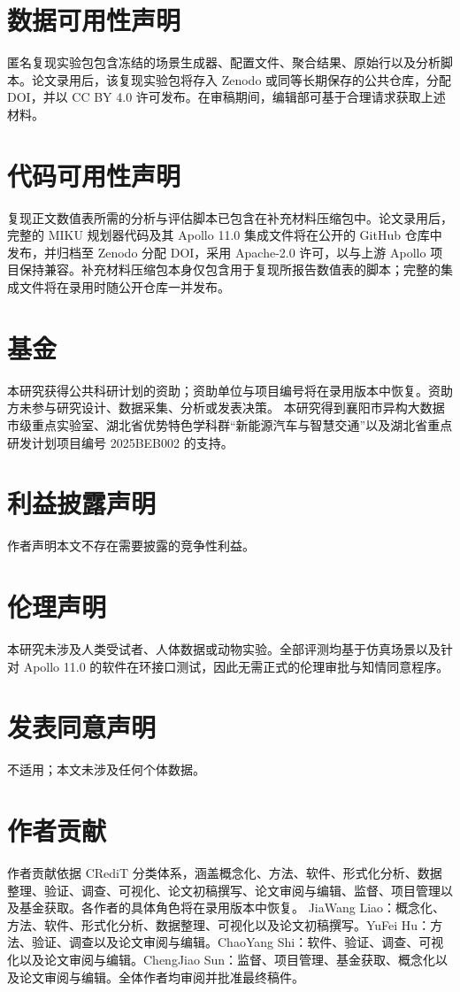 \section*{数据可用性声明}
匿名复现实验包包含冻结的场景生成器、配置文件、聚合结果、原始行以及分析脚本。论文录用后，该复现实验包将存入 Zenodo 或同等长期保存的公共仓库，分配 DOI，并以 CC BY 4.0 许可发布。在审稿期间，编辑部可基于合理请求获取上述材料。

\section*{代码可用性声明}
复现正文数值表所需的分析与评估脚本已包含在补充材料压缩包中。论文录用后，完整的 MIKU 规划器代码及其 Apollo 11.0 集成文件将在公开的 GitHub 仓库中发布，并归档至 Zenodo 分配 DOI，采用 Apache-2.0 许可，以与上游 Apollo 项目保持兼容。补充材料压缩包本身仅包含用于复现所报告数值表的脚本；完整的集成文件将在录用时随公开仓库一并发布。

\section*{基金}
\ifdefined\anonymousversion
本研究获得公共科研计划的资助；资助单位与项目编号将在录用版本中恢复。资助方未参与研究设计、数据采集、分析或发表决策。
\else
本研究得到襄阳市异构大数据市级重点实验室、湖北省优势特色学科群``新能源汽车与智慧交通''以及湖北省重点研发计划项目编号 2025BEB002 的支持。
\fi

\section*{利益披露声明}
作者声明本文不存在需要披露的竞争性利益。

\section*{伦理声明}
本研究未涉及人类受试者、人体数据或动物实验。全部评测均基于仿真场景以及针对 Apollo 11.0 的软件在环接口测试，因此无需正式的伦理审批与知情同意程序。

\section*{发表同意声明}
不适用；本文未涉及任何个体数据。

\section*{作者贡献}
\ifdefined\anonymousversion
作者贡献依据 CRediT 分类体系，涵盖概念化、方法、软件、形式化分析、数据整理、验证、调查、可视化、论文初稿撰写、论文审阅与编辑、监督、项目管理以及基金获取。各作者的具体角色将在录用版本中恢复。
\else
JiaWang Liao：概念化、方法、软件、形式化分析、数据整理、可视化以及论文初稿撰写。YuFei Hu：方法、验证、调查以及论文审阅与编辑。ChaoYang Shi：软件、验证、调查、可视化以及论文审阅与编辑。ChengJiao Sun：监督、项目管理、基金获取、概念化以及论文审阅与编辑。全体作者均审阅并批准最终稿件。
\fi

